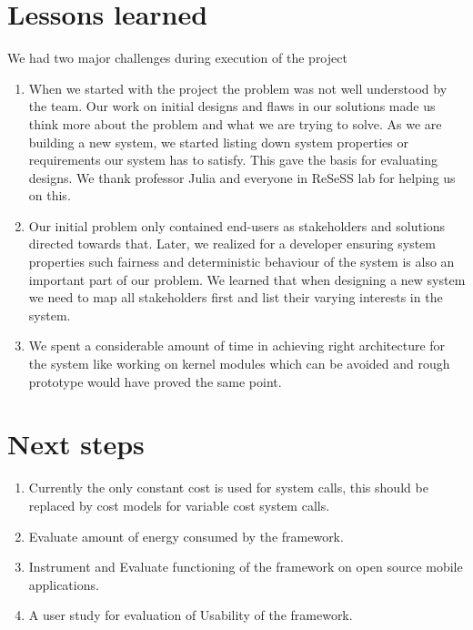 \section{Lessons learned}

We had two major challenges during execution of the project


\begin{enumerate}

\item When we started with the project the problem was not well understood by the team. Our work on initial designs and flaws in our solutions made us think more about the problem and what we are trying to solve. As we are building a new system, we started listing down system properties or requirements our system has to satisfy. This gave the basis for evaluating designs. We thank professor Julia and everyone in ReSeSS lab for helping us on this.

\item Our initial problem only contained end-users as stakeholders and solutions directed towards that. Later, we realized for a developer ensuring system properties such fairness and deterministic behaviour of the system is also an important part of our problem. We learned that when designing a new system we need to map all stakeholders first and list their varying interests in the system.

\item We spent a considerable amount of time in achieving right architecture for the system like working on kernel modules which can be avoided and rough prototype would have proved the same point.
\end{enumerate}


\section{Next steps}

\begin{enumerate}

\item Currently the only constant cost is used for system calls, this should be replaced by cost models for variable cost system calls.
\item Evaluate amount of energy consumed by the framework.
\item Instrument and Evaluate functioning of the framework on open source mobile applications.
\item A user study for evaluation of Usability of the framework. 

\end{enumerate}


